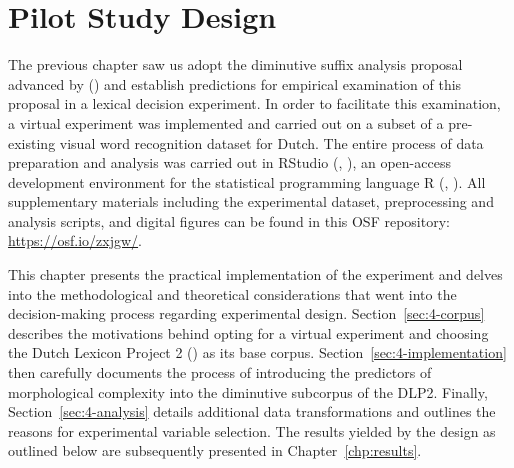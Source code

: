 \chapter{Pilot Study Design}\label{chp:study}
The previous chapter saw us adopt the diminutive suffix analysis proposal advanced by \citeauthor{DeBelder+etal+2014} (\citeyear{DeBelder+etal+2014}) and establish predictions for empirical examination of this proposal in a lexical decision experiment. In order to facilitate this examination, a virtual experiment was implemented and carried out on a subset of a pre-existing visual word recognition dataset for Dutch. The entire process of data preparation and analysis was carried out in RStudio (\citeauthor{RStudio}, \citeyear{RStudio}), an open-access development environment for the statistical programming language R (\citeauthor{rlang}, \citeyear{rlang}). All supplementary materials including the experimental dataset, preprocessing and analysis scripts, and digital figures can be found in this OSF repository: \url{https://osf.io/zxjgw/}. 

This chapter presents the practical implementation of the experiment and delves into the methodological and theoretical considerations that went into the decision-making process regarding experimental design. Section~\ref{sec:4-corpus} describes the motivations behind opting for a virtual experiment and choosing the Dutch Lexicon Project 2 (\cite{Brysbaert+etal+2016}) as its base corpus. Section~\ref{sec:4-implementation} then carefully documents the process of introducing the predictors of morphological complexity into the diminutive subcorpus of the DLP2. Finally, Section~\ref{sec:4-analysis} details additional data transformations and outlines the reasons for experimental variable selection. The results yielded by the design as outlined below are subsequently presented in Chapter~\ref{chp:results}.

